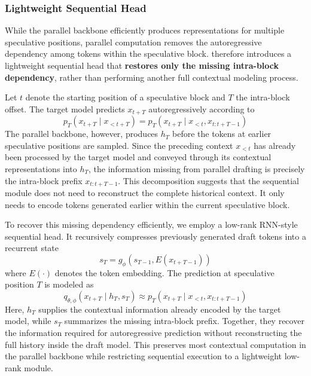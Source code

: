 


\subsubsection{Lightweight Sequential Head}


While the parallel backbone efficiently produces representations for multiple speculative positions, parallel computation removes the autoregressive dependency among tokens within the speculative block. \we therefore introduces a lightweight sequential head that \textbf{restores only the missing intra-block dependency}, rather than performing another full contextual modeling process.


Let \(t\) denote the starting position of a speculative block and \(T\) the intra-block offset. The target model predicts \(x_{t+T}\) autoregressively according to
\begin{equation}
p_T \left( x_{t+T}\mid x_{<t+T} \right) = p_T \left( x_{t+T} \mid x_{<t}, x_{t:t+T-1} \right) 
\end{equation}
The parallel backbone, however, produces \(h_T\) before the tokens at earlier speculative positions are sampled. Since the preceding context \(x_{<t}\) has already been processed by the target model and conveyed through its contextual representations into \(h_T\), the information missing from parallel drafting is precisely the intra-block prefix $ x_{t:t+T-1}$. This decomposition suggests that the sequential module does not need to reconstruct the complete historical context. It only needs to encode tokens generated earlier within the current speculative block.

To recover this missing dependency efficiently, we employ a low-rank RNN-style sequential head. It recursively compresses previously generated draft tokens into a recurrent state
\begin{equation}
s_T = g_{\phi} \left( s_{T-1}, E(x_{t+T-1}) \right)
\end{equation}
where \(E(\cdot)\) denotes the token embedding. The prediction at speculative position \(T\) is modeled as
\begin{equation}
q_{\theta,\phi} \left( x_{t+T}\mid h_T,s_T \right) \approx p_T \left( x_{t+T} \mid x_{<t}, x_{t:t+T-1} \right)
\end{equation}
Here, \(h_T\) supplies the contextual information already encoded by the target model, while \(s_T\) summarizes the missing intra-block prefix. Together, they recover the information required for autoregressive prediction without reconstructing the full history inside the draft model. This preserves most contextual computation in the parallel backbone while restricting sequential execution to a lightweight low-rank module.

